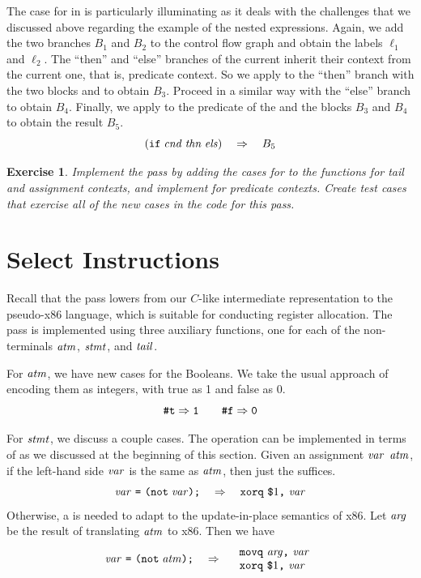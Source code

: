 \documentclass[11pt]{book}
\newtheorem{exercise}[theorem]{Exercise}
\begin{document}
The case for  in  is particularly
illuminating as it deals with the challenges that we discussed above
regarding the example of the nested  expressions.  Again, we
add the two branches $B_1$ and $B_2$ to the control flow graph and
obtain the labels $\ell_1$ and $\ell_2$.  The ``then'' and ``else''
branches of the current  inherit their context from the
current one, that is, predicate context. So we apply
 to the ``then'' branch with the two blocks
 and  to obtain $B_3$.  Proceed in a
similar way with the ``else'' branch to obtain $B_4$.  Finally, we
apply  to the predicate of the  and the
blocks $B_3$ and $B_4$ to obtain the result $B_5$.
\[
(\texttt{if}\; \mathit{cnd}\; \mathit{thn}\; \mathit{els})
\quad\Rightarrow\quad
B_5
\]

\begin{exercise}\normalfont
  Implement the pass  by adding the cases for
   to the functions for tail and assignment contexts, and
  implement  for predicate contexts. Create test
  cases that exercise all of the new cases in the code for this pass.
\end{exercise}


\section{Select Instructions}
\label{sec:select-r2}

Recall that the  pass lowers from our
$C$-like intermediate representation to the pseudo-x86 language, which
is suitable for conducting register allocation. The pass is
implemented using three auxiliary functions, one for each of the
non-terminals $\mathit{atm}$, $\mathit{stmt}$, and $\mathit{tail}$.

For $\mathit{atm}$, we have new cases for the Booleans.  We take the usual
approach of encoding them as integers, with true as 1 and false as 0.
\[
\texttt{\#t} \Rightarrow \texttt{1}
\qquad
\texttt{\#f} \Rightarrow \texttt{0}
\]

For $\mathit{stmt}$, we discuss a couple cases.  The  operation can
be implemented in terms of  as we discussed at the
beginning of this section. Given an assignment
$\mathit{var}$ \key{=}  $\mathit{atm}$\key{);},
if the left-hand side $\mathit{var}$ is
the same as $\mathit{atm}$, then just the  suffices.
\[
\mathit{var}~\texttt{=}~ \texttt{(not}\; \mathit{var}\texttt{);}
\quad\Rightarrow\quad
\texttt{xorq}~\texttt{\$}1\texttt{,}~\mathit{var}
\]
Otherwise, a  is needed to adapt to the update-in-place
semantics of x86. Let $\mathit{arg}$ be the result of translating $\mathit{atm}$ to
x86. Then we have
\[
\mathit{var}~\texttt{=}~ \texttt{(not}\; \mathit{atm}\texttt{);}
\quad\Rightarrow\quad
\begin{array}{l}
\texttt{movq}~\mathit{arg}\texttt{,}~\mathit{var}\\
\texttt{xorq}~\texttt{\$}1\texttt{,}~\mathit{var}
\end{array}
\]
\end{document}
